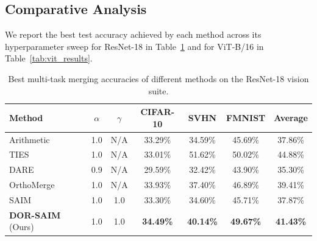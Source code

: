 \documentclass{article}
\begin{document}
\subsection{Comparative Analysis}
We report the best test accuracy achieved by each method across its hyperparameter sweep for ResNet-18 in Table~\ref{tab:r18_results} and for ViT-B/16 in Table~\ref{tab:vit_results}.

\begin{table}[ht]
\caption{Best multi-task merging accuracies of different methods on the ResNet-18 vision suite.}
\label{tab:r18_results}
\vskip 0.15in
\begin{center}
\begin{small}
\begin{tabular} {lcccccc}
\toprule
\textbf{Method} & \textbf{$\alpha$} & \textbf{$\gamma$} & \textbf{CIFAR-10} & \textbf{SVHN} & \textbf{FMNIST} & \textbf{Average} \\
\midrule
Arithmetic & 1.0 & N/A & 33.29\% & 34.59\% & 45.69\% & 37.86\% \\
TIES & 1.0 & N/A & 33.01\% & 51.62\% & 50.02\% & 44.88\% \\
DARE & 0.9 & N/A & 29.59\% & 32.42\% & 43.90\% & 35.30\% \\
OrthoMerge & 1.0 & N/A & 33.93\% & 37.40\% & 46.89\% & 39.41\% \\
SAIM & 1.0 & 1.0 & 33.30\% & 34.60\% & 45.71\% & 37.87\% \\
\midrule
\textbf{DOR-SAIM} (Ours) & 1.0 & 1.0 & \textbf{34.49\%} & \textbf{40.14\%} & \textbf{49.67\%} & \textbf{41.43\%} \\
\bottomrule
\end{tabular}
\end{small}
\end{center}
\vskip -0.1in
\end{table}
\end{document}
